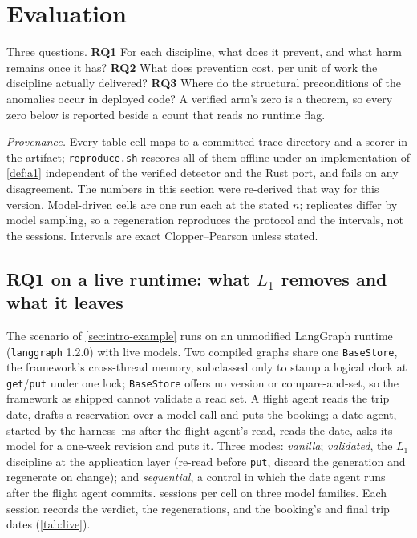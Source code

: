 \section{Evaluation}
\label{sec:eval}

Three questions. \textbf{RQ1} For each discipline, what does it prevent, and
what harm remains once it has? \textbf{RQ2} What does prevention cost, per
unit of work the discipline actually delivered? \textbf{RQ3} Where do the
structural preconditions of the anomalies occur in deployed code? A verified
arm's zero is a theorem, so every zero below is reported beside a count that
reads no runtime flag.

\smallskip\noindent\emph{Provenance.} Every table cell maps to a committed
trace directory and a scorer in the artifact; \texttt{reproduce.sh} rescores
all of them offline under an implementation of \cref{def:a1} independent of
the verified detector and the Rust port, and fails on any disagreement. The
numbers in this section were re-derived that way for this version.
Model-driven cells are one run each at the stated $n$; replicates differ by
model sampling, so a regeneration reproduces the protocol and the intervals,
not the sessions. Intervals are exact Clopper--Pearson unless stated.

\subsection{RQ1 on a live runtime: what $L_1$ removes and what it leaves}
\label{sec:live-a1}
The scenario of \cref{sec:intro-example} runs on an unmodified LangGraph
runtime (\texttt{langgraph} 1.2.0) with live models. Two compiled graphs
share one \texttt{BaseStore}, the framework's cross-thread memory, subclassed
only to stamp a logical clock at \texttt{get}/\texttt{put} under one lock;
\texttt{BaseStore} offers no version or compare-and-set, so the framework as
shipped cannot validate a read set. A flight agent reads the trip date,
drafts a reservation over a model call and puts the booking; a date agent,
started by the harness \LiveOffsetMs{}\,ms after the flight agent's read, reads
the date, asks its model for a one-week revision and puts it. Three modes:
\emph{vanilla}; \emph{validated}, the $L_1$ discipline at the application
layer (re-read before \texttt{put}, discard the generation and regenerate on
change); and \emph{sequential}, a control in which the date agent runs after
the flight agent commits. \LiveNPerCell{} sessions per cell on three model
families. Each session records the  verdict, the regenerations, and the booking's
and final trip dates (\cref{tab:live}).

